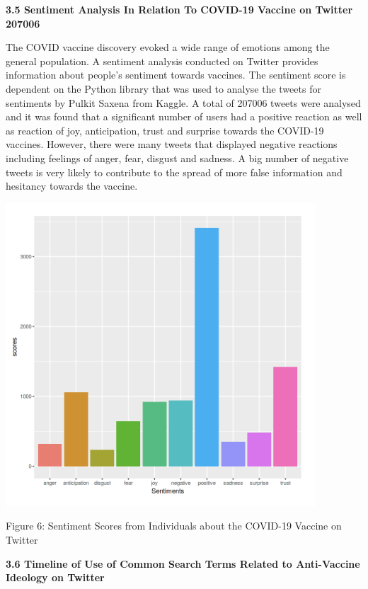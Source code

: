 \documentclass[10pt,twocolumn,letterpaper]{article}
\begin{document}
\textbf{3.5 Sentiment Analysis In Relation To COVID-19 Vaccine on Twitter 207006}

The COVID vaccine discovery evoked a wide range of emotions among the general population. A sentiment analysis conducted on Twitter provides information about people’s sentiment towards vaccines. The sentiment score is dependent on the Python library that was used to analyse the tweets for sentiments by Pulkit Saxena from Kaggle.  A total of 207006 tweets were analysed and  it was found that a significant number of users had a positive reaction as well as reaction of joy, anticipation, trust and surprise towards the COVID-19 vaccines. However, there were many tweets that displayed negative reactions including feelings of anger, fear, disgust and sadness. A big number of negative tweets is very likely to contribute to the spread of more false information and hesitancy towards the vaccine. 

\includegraphics[scale=1.3]{fig 6.png}
\caption{Figure 6: Sentiment Scores from  Individuals about the COVID-19 Vaccine on Twitter}

\vspace{\baselineskip}

\textbf{3.6 Timeline of Use of Common Search Terms Related to Anti-Vaccine Ideology on Twitter}

\vspace{\baselineskip}
\end{document}
